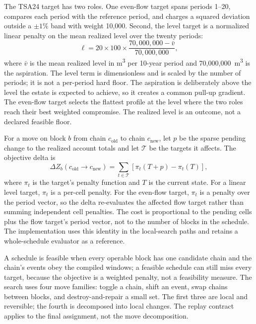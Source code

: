 \documentclass[a4paper,fleqn]{cas-sc}
\begin{document}
The TSA24 target has two roles. One even-flow target spans periods 1--20, compares each period with
the reference period, and charges a squared deviation outside a $\pm1\%$ band with weight 10,000.
Second, the level target is a normalized linear penalty on the mean realized level over the twenty
periods:
\begin{equation}
\ell = 20 \times 100 \times \frac{70{,}000{,}000 - \bar v}{70{,}000{,}000},
\label{eq:level}
\end{equation}
where $\bar v$ is the mean realized level in m\textsuperscript{3} per 10-year period and
70,000,000~m\textsuperscript{3} is the aspiration. The level term is dimensionless and is scaled by the
number of periods; it is not a per-period hard floor. The aspiration is deliberately above the level
the estate is expected to achieve, so it creates a common pull-up gradient. The even-flow target selects
the flattest profile at the level where the two roles reach their best weighted compromise. The
realized level is an outcome, not a declared feasible floor.

For a move on block $b$ from chain $c_{\mathrm{old}}$ to chain $c_{\mathrm{new}}$, let $p$ be the sparse
pending change to the realized account totals and let $\mathcal{T}$ be the targets it affects. The
objective delta is
\begin{equation}
\Delta Z_b(c_{\mathrm{old}}\!\to c_{\mathrm{new}})
= \sum_{t\in\mathcal{T}}\left[\pi_t(T+p)-\pi_t(T)\right],
\label{eq:delta}
\end{equation}
where $\pi_t$ is the target's penalty function and $T$ is the current state. For a linear level target,
$\pi_t$ is a per-cell penalty. For the even-flow target, $\pi_t$ is a penalty over the period vector, so
the delta re-evaluates the affected flow target rather than summing independent cell penalties. The
cost is proportional to the pending cells plus the flow target's period vector, not to the number of
blocks in the schedule. The implementation uses this identity in the local-search paths and retains a
whole-schedule evaluator as a reference.

A schedule is feasible when every operable block has one candidate chain and the chain's events obey the
compiled windows; a feasible schedule can still miss every target, because the objective is a weighted
penalty, not a feasibility measure. The search uses four move families: toggle a chain, shift an event,
swap chains between blocks, and destroy-and-repair a small set. The first three are local and
reversible; the fourth is decomposed into local changes. The replay contract applies to the final
assignment, not the move decomposition.
\end{document}
